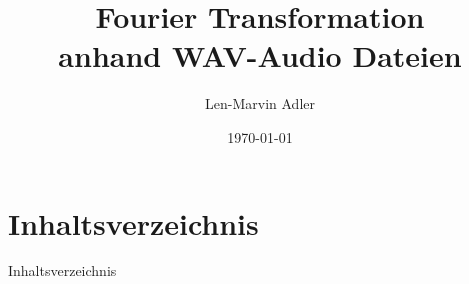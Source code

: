 \documentclass{beamer}
\title{Fourier Transformation \\ anhand WAV-Audio Dateien}
\author{Len-Marvin Adler}
\institute{Hochschule Bonn-Rhein-Sieg}
\date{\today}
\begin{document}
\frame{\titlepage}

\section*{Inhaltsverzeichnis}
\begin{frame}{Inhaltsverzeichnis}
	\tableofcontents
\end{frame}













\end{document}
